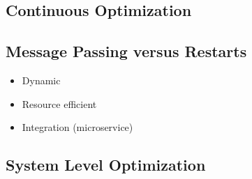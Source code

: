 \documentclass[preprint,12pt,authoryear]{elsarticle}
\begin{document}
\subsection{Continuous Optimization}


\subsection{Message Passing versus Restarts}
\begin{itemize}
	\item Dynamic
	\item Resource efficient
	\item Integration (microservice)  
\end{itemize}

\subsection{System Level Optimization}










\end{document}
